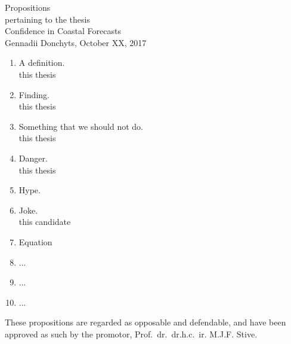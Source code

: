 \documentclass[oneside,10pt]{article}
\begin{document}
\clearpage
{}
\pagestyle{empty}
{
\centering

{\LARGE Propositions \\}
\vspace{0.5cm}
{\large pertaining to the thesis \\}
\vspace{0.5cm}
{\LARGE Confidence in Coastal Forecasts \\ }
\vspace{0.5cm}
{\large Gennadii Donchyts, October XX, 2017 \\}
}

\vfill


{
\large
\newcommand{\citat}[1]{\smth \hfill {\small #1}}
\newcommand{\smth}{$\left.\right.$}

\begin{enumerate}
%
\item A definition. \\
\citat{this thesis}
%
\item Finding. \\
\citat{this thesis}
%
\item Something that we should not do. \\
\citat{this thesis}

\item Danger. \\
\citat{this thesis}
%
\item Hype. \\

\item Joke. \\
\citat{this candidate}

\item Equation \\

\item ... \\

\item ...  \\

\item ...

\end{enumerate}
}

\vspace{0.5cm}
\noindent These propositions are regarded as opposable and defendable, and have been approved as such by the promotor, Prof.~dr.~dr.h.c.~ir. M.J.F. Stive.
\end{document}
